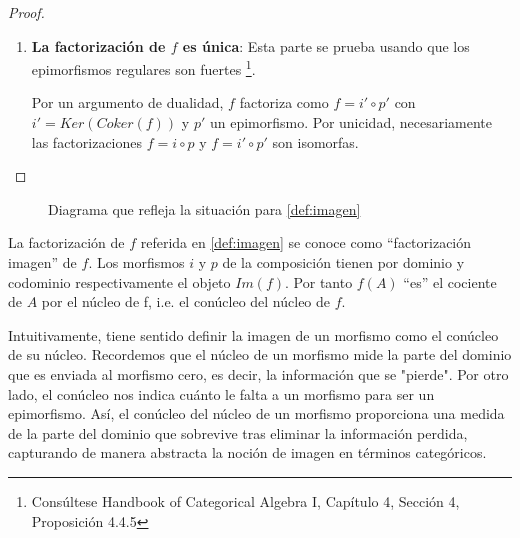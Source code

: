 \begin{proof}
\begin{enumerate}
        \item \textbf{La factorización de $f$ es única}: Esta parte se prueba usando que los epimorfismos regulares son fuertes \footnote{Consúltese Handbook of Categorical Algebra I, Capítulo 4, Sección 4, Proposición 4.4.5}.
        
        Por un argumento de dualidad, $f$ factoriza como $f = i' \circ p'$ con $i' = Ker(Coker(f))$ y $p'$ un epimorfismo. Por unicidad, necesariamente las factorizaciones $f = i \circ p$ y $f = i' \circ p'$ son isomorfas.
    \end{enumerate}
\end{proof}

\begin{figure}[ht!]
    \centering
    \caption{Diagrama que refleja la situación para \ref{def:imagen}}
    \label{diagrama-dificil-imagen}
\end{figure}


\begin{observacion}
    La factorización de $f$ referida en \ref{def:imagen} se conoce como ``factorización imagen'' de $f$. Los morfismos $i$ y $p$ de la composición tienen por dominio y codominio respectivamente el objeto $Im(f)$. Por tanto $f(A)$ ``es'' el cociente de $A$ por el núcleo de f, i.e. el conúcleo del núcleo de $f$. 
\end{observacion}

\begin{observacion}
    Intuitivamente, tiene sentido definir la imagen de un morfismo como el conúcleo de su núcleo. Recordemos que el núcleo de un morfismo mide la parte del dominio que es enviada al morfismo cero, es decir, la información que se "pierde". Por otro lado, el conúcleo nos indica cuánto le falta a un morfismo para ser un epimorfismo. Así, el conúcleo del núcleo de un morfismo proporciona una medida de la parte del dominio que sobrevive tras eliminar la información perdida, capturando de manera abstracta la noción de imagen en términos categóricos.
\end{observacion}


